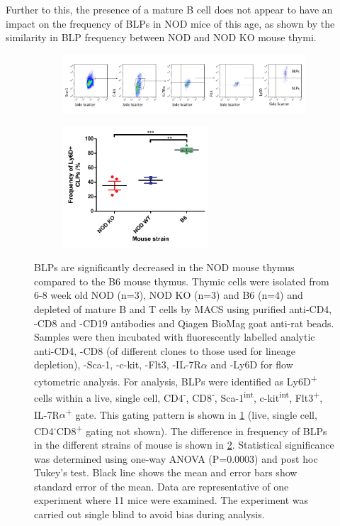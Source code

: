 Further to this, the presence of a mature B cell does not appear to have an impact on the frequency of BLPs in NOD mice of this age, as shown by the similarity in BLP frequency between NOD and NOD KO mouse thymi.


\begin{figure}
	\begin{subfigure}{\textwidth}
	\caption{}
	\includegraphics[width=\textwidth]{Figures/BLPgating.png}	
	\label{subfig:BLPgating}
	\end{subfigure}
	\begin{subfigure}{\textwidth}
	\centering
	\caption{}
	\includegraphics[width=0.6\textwidth]{Figures/Ly6D.pdf}	
	\label{subfig:BLPgraph}
	\end{subfigure}
\caption[BLPs are significantly decreased in the NOD mouse thymus compared to the B6 mouse thymus]{BLPs are significantly decreased in the NOD mouse thymus compared to the B6 mouse thymus.
Thymic cells were isolated from 6-8 week old NOD (n=3), NOD KO (n=3) and B6 (n=4) and depleted of mature B and T cells by MACS using purified anti-CD4, -CD8 and -CD19 antibodies and Qiagen BioMag goat anti-rat beads.
Samples were then incubated with fluorescently labelled analytic anti-CD4, -CD8 (of different clones to those used for lineage depletion), -Sca-1, -c-kit, -Flt3, -IL-7R$\alpha$ and -Ly6D for flow cytometric analysis.
For analysis, BLPs were identified as Ly6D\textsuperscript{+} cells within a live, single cell, CD4\textsuperscript{-}, CD8\textsuperscript{-}, Sca-1\textsuperscript{int}, c-kit\textsuperscript{int}, Flt3\textsuperscript{+}, IL-7R$\alpha$\textsuperscript{+} gate.
This gating pattern is shown in \ref{subfig:BLPgating} (live, single cell, CD4\textsuperscript{-}CD8\textsuperscript{+} gating not shown).
The difference in frequency of BLPs in the different strains of mouse is shown in \ref{subfig:BLPgraph}. Statistical significance was determined using one-way ANOVA (P=0.0003) and post hoc Tukey's test. Black line shows the mean and error bars show standard error of the mean.
Data are representative of one experiment where 11 mice were examined.
The experiment was carried out single blind to avoid bias during analysis.}
\label{fig:BLPs}
\end{figure}

